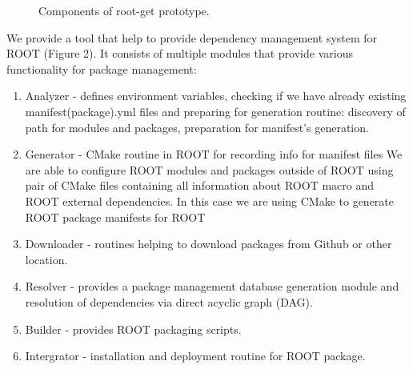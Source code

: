 \documentclass{webofc}
\begin{document}
\begin{figure}[!h]
  \centering
  \caption{Components of root-get prototype.}
  \label{fig:InformationFlow}
\end{figure}

We provide a tool that help to provide dependency management system for ROOT (Figure 2). It consists of multiple modules that provide various functionality for package management:
\begin{enumerate}
\item Analyzer - defines environment variables, checking if we have already existing manifest(package).yml files and preparing for generation routine: discovery of path for modules and packages, preparation for manifest’s generation.
\item Generator - CMake routine  in ROOT for recording info for manifest files
We are able to configure ROOT modules and packages outside of ROOT using  pair of CMake files containing all information about ROOT macro and ROOT external dependencies. In this case we are using CMake to generate ROOT package manifests for ROOT

\item Downloader - routines helping to download packages from Github or other location.
\item Resolver - provides a package management database generation module and resolution of dependencies via direct acyclic graph (DAG).
\item Builder - provides ROOT packaging scripts.
\item Intergrator - installation and deployment routine for ROOT package. 
\end{enumerate}
\end{document}
